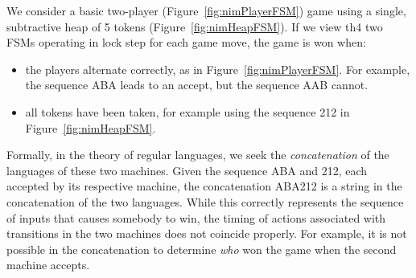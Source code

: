 \documentclass[sigplan,anonymous,review]{acmart}
\begin{document}
We consider a basic two-player (Figure~\ref{fig:nimPlayerFSM}) game using a single, subtractive heap of 5 tokens (Figure~\ref{fig:nimHeapFSM}).
If we view th4 two FSMs operating in lock step for each game move, the game is won when:
\begin{itemize}
    \item the players alternate correctly, as in Figure~\ref{fig:nimPlayerFSM}.  For example, the sequence ABA leads to an accept, but the sequence AAB cannot.
    \item all tokens have been taken, for example using the sequence 212 in Figure~\ref{fig:nimHeapFSM}.
\end{itemize}
Formally, in the theory of regular languages, we seek the \emph{concatenation} of the languages of these two machines.   Given the sequence ABA and 212, each accepted by its respective machine, the concatenation ABA212 is a string in the concatenation of the two languages.  While this correctly represents the sequence of inputs that causes somebody to win, the timing of actions associated with transitions in the two machines does not coincide properly.  For example, it is not possible in the concatenation to determine \emph{who} won the game when the second machine accepts. 
\end{document}
